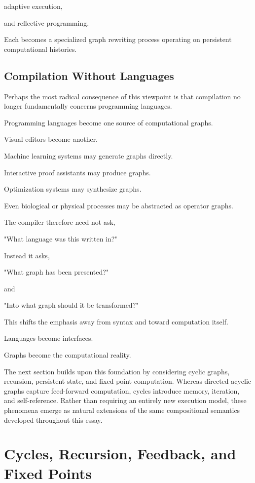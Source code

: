 \documentclass[12pt,oneside]{article}
\begin{document}
adaptive execution,

and reflective programming.

Each becomes a specialized graph rewriting process operating on persistent computational histories.

\subsection{Compilation Without Languages}

Perhaps the most radical consequence of this viewpoint is that compilation no longer fundamentally concerns programming languages.

Programming languages become one source of computational graphs.

Visual editors become another.

Machine learning systems may generate graphs directly.

Interactive proof assistants may produce graphs.

Optimization systems may synthesize graphs.

Even biological or physical processes may be abstracted as operator graphs.

The compiler therefore need not ask,

"What language was this written in?"

Instead it asks,

"What graph has been presented?"

and

"Into what graph should it be transformed?"

This shifts the emphasis away from syntax and toward computation itself.

Languages become interfaces.

Graphs become the computational reality.

The next section builds upon this foundation by considering cyclic graphs, recursion, persistent state, and fixed-point computation. Whereas directed acyclic graphs capture feed-forward computation, cycles introduce memory, iteration, and self-reference. Rather than requiring an entirely new execution model, these phenomena emerge as natural extensions of the same compositional semantics developed throughout this essay.

\section{Cycles, Recursion, Feedback, and Fixed Points}
\end{document}

